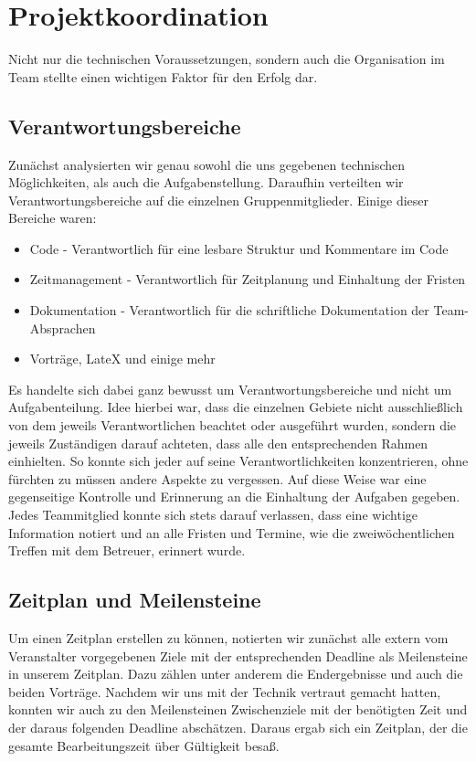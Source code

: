 \section{Projektkoordination}
\label{sec:projektkoordination}

Nicht nur die technischen Voraussetzungen, sondern auch die Organisation im Team stellte einen wichtigen Faktor für den Erfolg dar.

\subsection{Verantwortungsbereiche}
Zunächst analysierten wir genau sowohl die uns gegebenen technischen Möglichkeiten, als auch die Aufgabenstellung. Daraufhin verteilten wir Verantwortungsbereiche auf die einzelnen Gruppenmitglieder. Einige dieser Bereiche waren:
\begin{itemize}
	\item Code - Verantwortlich für eine lesbare Struktur und Kommentare im Code
	\item Zeitmanagement - Verantwortlich für Zeitplanung und Einhaltung der Fristen
	\item Dokumentation - Verantwortlich für die schriftliche Dokumentation der Team-Absprachen
	\item Vorträge, LateX und einige mehr
\end{itemize}
Es handelte sich dabei ganz bewusst um Verantwortungsbereiche und nicht um Aufgabenteilung. Idee hierbei war, dass die einzelnen Gebiete nicht ausschließlich von dem jeweils Verantwortlichen beachtet oder ausgeführt wurden, sondern die jeweils Zuständigen darauf achteten, dass alle den entsprechenden Rahmen einhielten. So konnte sich jeder auf seine Verantwortlichkeiten konzentrieren, ohne fürchten zu müssen andere Aspekte zu vergessen. Auf diese Weise war eine gegenseitige Kontrolle und Erinnerung an die Einhaltung der Aufgaben gegeben. Jedes Teammitglied konnte sich stets darauf verlassen, dass eine wichtige Information notiert und an alle Fristen und Termine, wie die zweiwöchentlichen Treffen mit dem Betreuer, erinnert wurde.


\subsection{Zeitplan und Meilensteine}
Um einen Zeitplan erstellen zu können, notierten wir zunächst alle extern vom Veranstalter vorgegebenen Ziele mit der entsprechenden Deadline als Meilensteine in unserem Zeitplan. Dazu zählen unter anderem die Endergebnisse und auch die beiden Vorträge. Nachdem wir uns mit der Technik vertraut gemacht hatten, konnten wir auch zu den Meilensteinen Zwischenziele mit der benötigten Zeit und der daraus folgenden Deadline abschätzen. Daraus ergab sich ein Zeitplan, der die gesamte Bearbeitungszeit über Gültigkeit besaß.
\pagebreak
